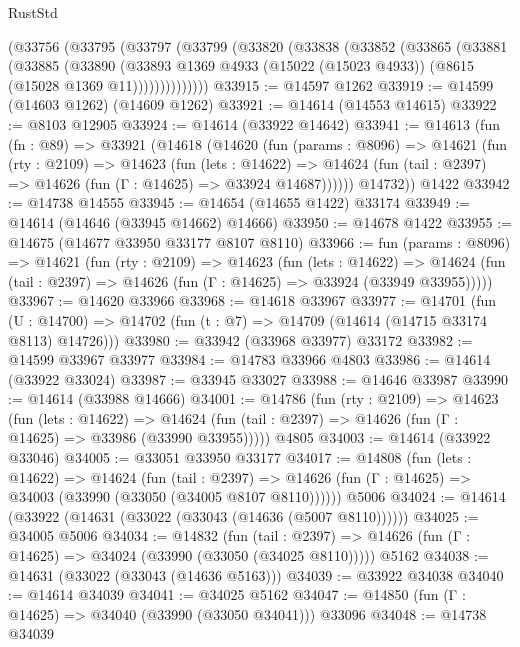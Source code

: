 \begin{lexlean}{RustStd}
\begin{coremodule}
    (@33756
      (@33795
        (@33797
          (@33799
            (@33820
              (@33838
                (@33852
                  (@33865
                    (@33881
                      (@33885
                        (@33890
                          (@33893
                            @1369
                            @4933
                            (@15022 (@15023 @4933))
                            (@8615 (@15028 @1369 @11))))))))))))))
@33915 := @14597 @1262
@33919 := @14599 (@14603 @1262) (@14609 @1262)
@33921 := @14614 (@14553 @14615)
@33922 := @8103 @12905
@33924 := @14614 (@33922 @14642)
@33941 := @14613
    (fun (fn : @89) =>
    @33921
      (@14618
        (@14620
          (fun (params : @8096) =>
          @14621
            (fun (rty : @2109) =>
            @14623
              (fun (lets : @14622) =>
              @14624 (fun (tail : @2397) => @14626 (fun (Γ : @14625) => @33924 @14687))))))
        @14732))
    @1422
@33942 := @14738 @14555
@33945 := @14654 (@14655 @1422) @33174
@33949 := @14614 (@14646 (@33945 @14662) @14666)
@33950 := @14678 @1422
@33955 := @14675 (@14677 @33950 @33177 @8107 @8110)
@33966 := fun (params : @8096) =>
  @14621
    (fun (rty : @2109) =>
    @14623
      (fun (lets : @14622) =>
      @14624 (fun (tail : @2397) => @14626 (fun (Γ : @14625) => @33924 (@33949 @33955)))))
@33967 := @14620 @33966
@33968 := @14618 @33967
@33977 := @14701
    (fun (U : @14700) => @14702 (fun (t : @7) => @14709 (@14614 (@14715 @33174 @8113) @14726)))
@33980 := @33942 (@33968 @33977) @33172
@33982 := @14599 @33967 @33977
@33984 := @14783 @33966 @4803
@33986 := @14614 (@33922 @33024)
@33987 := @33945 @33027
@33988 := @14646 @33987
@33990 := @14614 (@33988 @14666)
@34001 := @14786
    (fun (rty : @2109) =>
    @14623
      (fun (lets : @14622) =>
      @14624 (fun (tail : @2397) => @14626 (fun (Γ : @14625) => @33986 (@33990 @33955)))))
    @4805
@34003 := @14614 (@33922 @33046)
@34005 := @33051 @33950 @33177
@34017 := @14808
    (fun (lets : @14622) =>
    @14624
      (fun (tail : @2397) =>
      @14626 (fun (Γ : @14625) => @34003 (@33990 (@33050 (@34005 @8107 @8110))))))
    @5006
@34024 := @14614 (@33922 (@14631 (@33022 (@33043 (@14636 (@5007 @8110))))))
@34025 := @34005 @5006
@34034 := @14832
    (fun (tail : @2397) => @14626 (fun (Γ : @14625) => @34024 (@33990 (@33050 (@34025 @8110)))))
    @5162
@34038 := @14631 (@33022 (@33043 (@14636 @5163)))
@34039 := @33922 @34038
@34040 := @14614 @34039
@34041 := @34025 @5162
@34047 := @14850 (fun (Γ : @14625) => @34040 (@33990 (@33050 @34041))) @33096
@34048 := @14738 @34039

\end{coremodule}
\end{lexlean}
